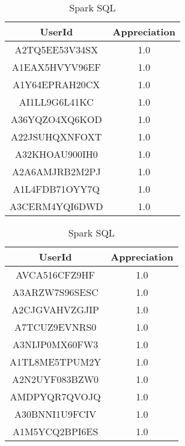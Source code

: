 \begin{itemize}
    \begin{table}[!ht]
      \centering
      \begin{minipage}{.5\textwidth}
        \centering
        \caption{Spark Core}
        \begin{tabular}{cc}
          \toprule
          UserId & Appreciation \\
          \midrule
              A2TQ5EE53V34SX & 1.0 \\
              A1EAX5HVYV96EF & 1.0 \\
              A1Y64EPRAH20CX & 1.0 \\
              AI1LL9G6L41KC & 1.0 \\
              A36YQZO4XQ6KOD & 1.0 \\
              A22JSUHQXNFOXT & 1.0 \\
              A32KHOAU900IH0 & 1.0 \\
              A2A6AMJRB2M2PJ & 1.0 \\
              A1L4FDB71OYY7Q & 1.0 \\
              A3CERM4YQI6DWD & 1.0 \\
          \bottomrule
        \end{tabular}
      \end{minipage}%
      \begin{minipage}{.5\textwidth}
        \centering
        \caption{Spark SQL}
        \begin{tabular}{cc}
          \toprule
          UserId & Appreciation \\
          \midrule
              AVCA516CFZ9HF & 1.0 \\
              A3ARZW7S96SESC & 1.0 \\
              A2CJGVAHVZGJIP & 1.0 \\
              A7TCUZ9EVNRS0 & 1.0 \\
              A3NIJP0MX60FW3 & 1.0 \\
              A1TL8ME5TPUM2Y & 1.0 \\
              A2N2UYF083BZW0 & 1.0 \\
              AMDPYQR7QVOJQ & 1.0 \\
              A30BNNI1U9FCIV & 1.0 \\
              A1M5YCQ2BPI6ES & 1.0 \\
          \bottomrule
        \end{tabular}
      \end{minipage}
    \end{table}
    \newpage
    

\end{itemize}
